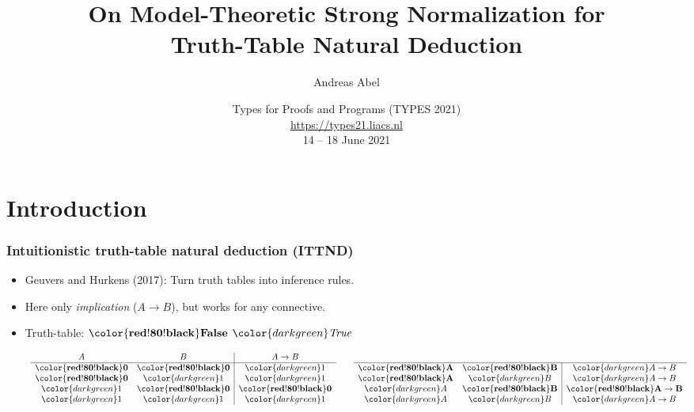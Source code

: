 \documentclass[t,fleqn,usenames,dvipsnames]{beamer}
\title[Strong Normalization for Truth-Table Natural Deduction]{%
On Model-Theoretic Strong Normalization for \\ Truth-Table Natural Deduction}
\author[Abel]{
  Andreas Abel\inst{1}
}
\institute[] %
{
  \inst{1}
  Department of Computer Science and Engineering\\
  Chalmers and Gothenburg University, Sweden \\[1ex]
}
\date[TYPES 2021] %
{ Types for Proofs and Programs (TYPES 2021)\\
  \url{https://types21.liacs.nl} \\
  14 -- 18 June 2021
}
\newcommand{\cAnn}{\color{red!80!black}}%
\renewcommand{\emph}[1]{{\cAnn#1}}
\newcommand{\cType}{\color{orange!60!black}}
\renewcommand{\emph}[1]{\textit{\cType#1}}
\newcommand{\cFalse}{\color{red!80!black}}
\newcommand{\cTrue}{\color{darkgreen}}%
\newcommand{\True}[1]{\ensuremath{{\cTrue#1}}}
\newcommand{\False}[1]{\ensuremath{\mathbf{{\cFalse#1}}}}
\begin{document}
\maketitle


\section{Introduction}


\begin{frame}%
  \frametitle{Intuitionistic truth-table natural deduction (ITTND)}
  \begin{itemize}
  \item Geuvers and Hurkens (2017): Turn truth tables into inference
    rules.
  \item Here only \emph{implication} ($A \to B$), but works for any connective.
  \item Truth-table: \False{False}
    \True{\mathit{True}}

\[
\begin{array}{c@{\qquad}c}
\begin{array}[b]{cc|c}
  A & B & A \to B \\
\hline
  \False{0} & \False{0} & \True{1} \\
  \False{0} & \True{1} & \True{1} \\
  \True{1} & \False{0} & \False{0} \\
  \True{1} & \True{1} & \True{1} \\
\end{array}
\qquad
\begin{array}[b]{cc|c}
\hline
  \False A & \False B & \True{A \to B} \\
  \False A & \True  B & \True{A \to B} \\
  \True  A & \False B & \False{A \to B} \\
  \True  A & \True  B & \True{A \to B} \\
\end{array}
\end{array}
\]
  \end{itemize}
\end{frame}
\end{document}

